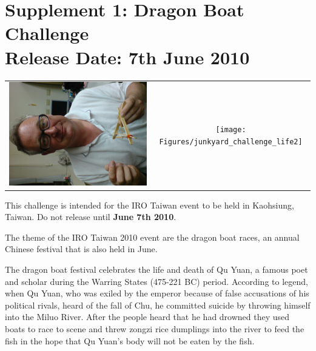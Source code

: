 \documentclass[12pt]{hurocup}
\begin{document}
\newpage

\section{Supplement 1: Dragon Boat Challenge\\Release Date: 7th June 2010}
\label{sec:supp-dragaon-boat-challenge}

\begin{center}
\begin{tabular}{cc}
 \includegraphics[width=0.4\linewidth,angle=-90]{Figures/junkyard_challenge_life3} &
 \texttt{[image: Figures/junkyard\_challenge\_life2]}\\
\end{tabular}
\end{center}

This challenge is intended for the IRO Taiwan event to be held in
Kaohsiung, Taiwan. Do not release until \textbf{June 7th 2010}.

The theme of the IRO Taiwan 2010 event are the dragon boat races, an
annual Chinese festival that is also held in June.

The dragon boat festival celebrates the life and death of Qu Yuan, a
famous poet and scholar during the Warring States (475-221 BC)
period. According to legend, when Qu Yuan, who was exiled by the
emperor because of false accusations of his political rivals, heard of
the fall of Chu, he committed suicide by throwing himself into the
Miluo River. After the people heard that he had drowned they used
boats to race to scene and threw zongzi rice dumplings into the river
to feed the fish in the hope that Qu Yuan's body will not be eaten by
the fish.

\label{dbc-field}
\end{document}
